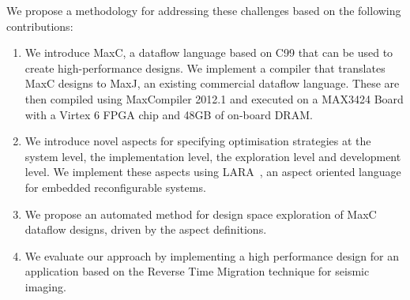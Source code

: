 We propose a methodology for addressing these challenges based on the
following contributions:
\begin{enumerate}
\item We introduce MaxC, a dataflow language based on C99 that can be
  used to create high-performance designs. We implement a compiler
  that translates MaxC designs to MaxJ, an existing commercial dataflow
  language. These are then compiled using MaxCompiler 2012.1 and
  executed on a MAX3424 Board with a Virtex 6 FPGA chip and 48GB of
  on-board DRAM.
\item We introduce novel aspects for specifying optimisation
  strategies at the system level, the implementation level, the
  exploration level and development level. We implement these aspects using LARA~\cite{Cardoso:Carvalho:Cutinho:Luk:Nobre:Diniz:Petrov:2012}, an aspect
  oriented language for embedded reconfigurable systems.
\item We propose an automated method for design space exploration of
  MaxC dataflow designs, driven by the aspect definitions.
\item We evaluate our approach by implementing a high performance
  design for an application based on the Reverse Time Migration
  technique for seismic imaging.
\end{enumerate}
